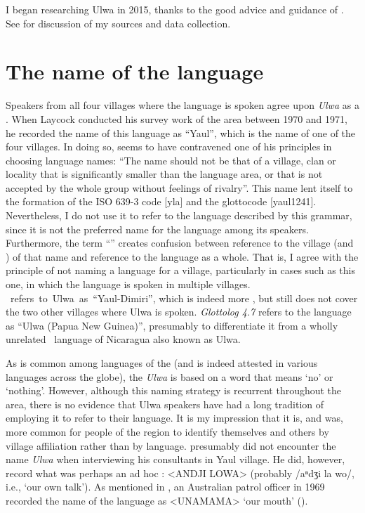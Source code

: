 I began researching Ulwa in 2015, thanks to the good advice and guidance of . See  for discussion of my sources and data collection.

\section{The name of the language}\label{sec:1.5.1}

Speakers from all four villages where the language is spoken agree upon \textit{Ulwa} as a . When Laycock conducted his survey work of the  area between 1970 and 1971, he recorded the name of this language as “Yaul”, which is the name of one of the four villages. In doing so, \citet[3]{Laycock1973} seems to have contravened one of his principles in choosing language names: “The name should not be that of a village, clan or locality that is significantly smaller than the language area, or that is not accepted by the whole group without feelings of rivalry”. This name lent itself to the formation of the ISO 639-3 code [yla] and the glottocode [yaul1241]. Nevertheless, I do not use it to refer to the language described by this grammar, since it is not the preferred name for the language among its speakers. Furthermore, the term “” creates confusion between reference to the village (and ) of that name and reference to the language as a whole. That is, I agree with the principle of not naming a language for a village, particularly in cases such as this one, in which the language is spoken in multiple villages. \mbox{\citet[206]{Foley2018} refers to Ulwa as “Yaul-Dimiri”,} which is indeed more , but still does not cover the two other villages where Ulwa is spoken. \textit{Glottolog 4.7} \citep{HammarströmEtAl2022} refers to the language as “Ulwa (Papua New Guinea)”, presumably to differentiate it from a wholly unrelated \mbox{ language} of  Nicaragua also known as Ulwa.

As is common among languages of the  (and is indeed attested in various languages across the globe), the  \textit{Ulwa} is based on a word that means ‘no’ or ‘nothing’. However, although this naming strategy is recurrent throughout the  area, there is no evidence that Ulwa speakers have had a long tradition of employing it to refer to their language. It is my impression that it is, and was, more common for people of the region to identify themselves and others by village affiliation rather than by language. \citet[3218]{Laycock1971a} presumably did not encounter the name \textit{Ulwa} when interviewing his consultants in Yaul village. He did, however, record what was perhaps an ad hoc : <ANDJI LOWA> (probably /aⁿdʒi la wo/, i.e., ‘our own talk’). As mentioned in , an Australian patrol officer in 1969 recorded the name of the language as <UNAMAMA> ‘our mouth’ (\citealt{PatrolReports1969}).

